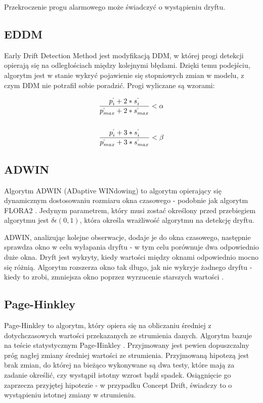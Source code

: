 \documentclass{classrep}
\begin{document}
Przekroczenie progu alarmowego może świadczyć o wystąpieniu dryftu.

\subsection{EDDM}

Early Drift Detection Method jest modyfikacją DDM, w której progi detekcji opierają się na odległościach między kolejnymi błędami. Dzięki temu podejściu, algorytm jest w stanie wykryć pojawienie się stopniowych zmian w modelu, z czym DDM nie potrafił sobie poradzić. Progi wyliczane są wzorami:

\begin{align*}
    \frac{p^`_i + 2 * s^`_i}{p^`_{max} + 2 * s^`_{max}} < \alpha \\ \\
    \frac{p^`_i + 3 * s^`_i}{p^`_{max} + 3 * s^`_{max}} < \beta
\end{align*}

\subsection{ADWIN}

Algorytm ADWIN (ADaptive WINdowing) to algorytm opierający się dynamicznym dostosowaniu rozmiaru okna czasowego - podobnie jak algorytm FLORA2 \cite{AdwinFlora}. Jedynym parametrem, który musi zostać określony przed przebiegiem algorytmu jest $\delta \epsilon (0, 1)$, która określa wrażliwość algorytmu na detekcję dryftu.

ADWIN, analizując kolejne obserwacje, dodaje je do okna czasowego, następnie sprawdza okno w celu wyłapania dryftu - w tym celu porównuje dwa odpowiednio duże okna. Dryft jest wykryty, kiedy wartości między oknami odpowiednio mocno się różnią. Algorytm rozszerza okno tak długo, jak nie wykryje żadnego dryftu - kiedy to zrobi, zmniejsza okno poprzez wyrzucenie starszych wartości \cite{Adwin}. 

\subsection{Page-Hinkley}

Page-Hinkley to algorytm, który opiera się na obliczaniu średniej z dotychczasowych wartości przekazanych ze strumienia danych. Algorytm bazuje na teście statystycznym Page-Hinkley \cite{Page}. Przyjmowany jest pewien dopuszczalny próg nagłej zmiany średniej wartości ze strumienia. Przyjmowaną hipotezą jest brak zmian, do której na bieżąco wykonywane są dwa testy, które mają za zadanie określić, czy wystąpił istotny wzrost bądź spadek. Osiągnięcie go zaprzecza przyjętej hipotezie - w przypadku Concept Drift,  świadczy to o wystąpieniu istotnej zmiany w strumieniu. 
\end{document}
